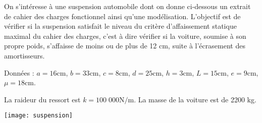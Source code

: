 % 
%
%
%
%
%



On s'intéresse à une suspension automobile dont on donne ci-dessous un extrait de cahier des charges fonctionnel ainsi qu’une modélisation. L'objectif est de vérifier si la suspension satisfait le niveau du critère d'affaissement statique maximal du cahier des charges, c'est à dire vérifier si la voiture, soumise à son propre poids, s'affaisse de moins ou de plus de 12 cm, suite à l'écrasement des amortisseurs. 


%
%
%
%
%



Données : $a = 16 \text{cm}$, $b = 33 \text{cm}$, $c = 8 \text{cm}$, $d = 25 \text{cm}$, $h = 3 \text{cm}$, $L = 15 \text{cm}$, $e = 9 \text{cm}$, $\mu = 18 \text{cm}$. 

La raideur du ressort est $k = 100\;000 \text{N/m}$. La masse de la voiture est de 2200 kg.




\begin{center}
\texttt{[image: suspension]}
\end{center}

